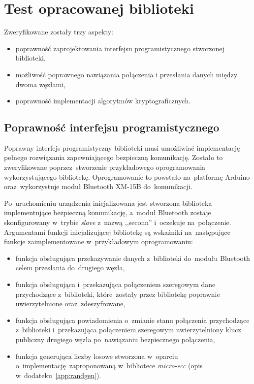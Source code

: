 \chapter{Test opracowanej biblioteki}
\label{cha:walidacja}

Zweryfikowane zostały trzy aspekty:

\begin{itemize}
\item poprawność zaprojektowania interfejsu programistycznego stworzonej biblioteki,
\item możliwość poprawnego nawiązania połączenia i przesłania danych między dwoma węzłami,
\item poprawność implementacji algorytmów kryptograficznych.
\end{itemize}

\section{Poprawność interfejsu programistycznego}

Poprawny interfejs programistyczny biblioteki musi umożliwiać implementację pełnego rozwiązania zapewniającego bezpieczną komunikację. Zostało to zweryfikowane poprzez~stworzenie przykładowego oprogramowania wykorzystującego bibliotekę. Oprogramowanie to powstało na~platformę Arduino oraz~wykorzystuje moduł Bluetooth XM-15B do~komunikacji.

Po~uruchomieniu urządzenia inicjalizowana jest stworzona biblioteka implementujące bezpieczną komunikację, a~moduł Bluetooth zostaje skonfigurowany w~trybie \emph{slave} z~nazwą ,,seconn'' i~oczekuje na~połączenie. Argumentami funkcji inicjalizującej bibliotekę są wskaźniki na~następujące funkcje zaimplementowane w~przykładowym oprogramowaniu:

\begin{itemize}
    \item funkcja obsługująca przekazywanie danych z~biblioteki do~modułu Bluetooth celem przesłania do~drugiego węzła,
    \item funkcja obsługująca i~przekazująca połączeniem szeregowym dane przychodzące z~biblioteki, które~zostały przez bibliotekę poprawnie uwierzytelnione oraz~zdeszyfrowane,
    \item funkcja obsługująca powiadomienia o~zmianie stanu połączenia przychodzące z~biblioteki i~przekazująca połączeniem szeregowym uwierzytelniony klucz publiczny drugiego węzła po~nawiązaniu bezpiecznego połączenia,
    \item funkcja generująca liczby losowe stworzona w~oparciu o~implementację zaproponowaną w~bibliotece {\itshape micro-ecc} (opis w~dodateku~\ref{app:randgen}).
\end{itemize}


